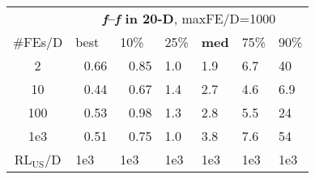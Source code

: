 \begin{tabular}{c|llllll}
 & \multicolumn{6}{|c}{\textbf{\textit{f}\raisebox{-0.35ex}{1}--\textit{f}\raisebox{-0.35ex}{24} in 20-D}, maxFE/D=1000}\\
\#FEs/D & best & 10\% & 25\% & \textbf{med} & 75\% & 90\%\\
2 & ~\,0.66 & ~\,0.85 & \hspace*{1ex}1.0 & \hspace*{1ex}1.9 & \hspace*{1ex}6.7 & 40\\
10 & ~\,0.44 & ~\,0.67 & \hspace*{1ex}1.4 & \hspace*{1ex}2.7 & \hspace*{1ex}4.6 & \hspace*{1ex}6.9\\
100 & ~\,0.53 & ~\,0.98 & \hspace*{1ex}1.3 & \hspace*{1ex}2.8 & \hspace*{1ex}5.5 & 24\\
1e3 & ~\,0.51 & ~\,0.75 & \hspace*{1ex}1.0 & \hspace*{1ex}3.8 & \hspace*{1ex}7.6 & 54\\
$\text{RL}_{\text{US}}$/D & 1e3 & 1e3 & 1e3 & 1e3 & 1e3 & 1e3
\end{tabular}
